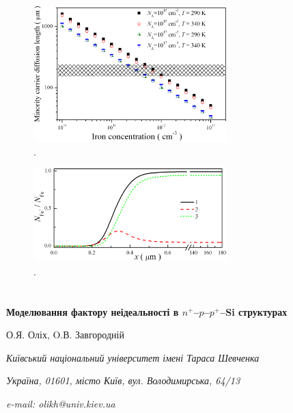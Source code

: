 \documentclass[12pt]{article}
\begin{document}
\begin{figure}
\includegraphics[width=7.5cm]{FigLn}
\caption{.
}
\label{FigLn}
\end{figure}

\begin{figure}
\includegraphics[width=7.5cm]{FigDelFei}
\caption{.
}
\label{FigDelFei}
\end{figure}

\clearpage

\section*{}

\begin{center}
{\bfseries Моделювання фактору неідеальності в $n^+$--$p$--$p^+$--Si структурах}

О.Я. Оліх, O.В. Завгородній

\emph{Київський національний університет імені Тараса Шевченка}

\emph{Україна, 01601, місто Київ, вул. Володимирська, 64/13}

\emph{e-mail: olikh@univ.kiev.ua}

\end{center}
\end{document}
